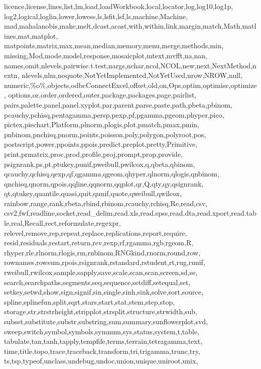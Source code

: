 {{      licence,license,lines,list,lm,load,loadWorkbook,local,locator,log,log10,log1p,%
      log2,logical,loglin,lower,lowess,ls,lsfit,lsf,ls,machine,Machine,%
      mad,mahalanobis,make,melt,dcast,acast,with,within,link,margin,match,Math,matlines,mat,matplot,%
      matpoints,matrix,max,mean,median,memory,menu,merge,methods,min,%
      missing,Mod,mode,model,response,mosaicplot,mtext,mvfft,na,nan,%
      names,omit,nlevels,pairwise.t.test,nargs,nchar,ncol,NCOL,new,next,NextMethod,nextn,%
      nlevels,nlm,noquote,NotYetImplemented,NotYetUsed,nrow,NROW,null,%
      numeric,\%o\%,objects,odbcConnectExcel,offset,old,on,Ops,optim,optimise,optimize,%
      options,or,order,ordered,outer,package,packages,page,pairlist,%
      pairs,palette,panel,panel.xyplot,par,parent,parse,paste,path,pbeta,pbinom,%
      pcauchy,pchisq,pentagamma,persp,pexp,pf,pgamma,pgeom,phyper,pico,%
      pictex,piechart,Platform,plnorm,plogis,plot,pmatch,pmax,pmin,%
      pnbinom,pnchisq,pnorm,points,poisson,poly,polygon,polyroot,pos,%
      postscript,power,ppoints,ppois,predict,preplot,pretty,Primitive,%
      print,prmatrix,proc,prod,profile,proj,prompt,prop,provide,%
      psignrank,ps,pt,ptukey,punif,pweibull,pwilcox,q,qbeta,qbinom,%
      qcauchy,qchisq,qexp,qf,qgamma,qgeom,qhyper,qlnorm,qlogis,qnbinom,%
      qnchisq,qnorm,qpois,qqline,qqnorm,qqplot,qr,Q,qty,qy,qsignrank,%
      qt,qtukey,quantile,quasi,quit,qunif,quote,qweibull,qwilcox,%
      rainbow,range,rank,rbeta,rbind,rbinom,rcauchy,rchisq,Re,read,csv,%
      csv2,fwf,readline,socket,read_delim,read.xls,read.spss,read.dta,read.xport,read.table,real,Recall,rect,reformulate,regexpr,%
      relevel,remove,rep,repeat,replace,replications,report,require,%
      resid,residuals,restart,return,rev,rexp,rf,rgamma,rgb,rgeom,R,%
      rhyper,rle,rlnorm,rlogis,rm,rnbinom,RNGkind,rnorm,round,row,%
      rownames,rowsum,rpois,rsignrank,rstandard,rstudent,rt,rug,runif,%
      rweibull,rwilcox,sample,sapply,save,scale,scan,scan,screen,sd,se,%
      search,searchpaths,segments,seq,sequence,setdiff,setequal,set,%
      setkey,setwd,show,sign,signif,sin,single,sinh,sink,solve,sort,source,%
      spline,splinefun,split,sqrt,stars,start,stat,stem,step,stop,%
      storage,str,strstrheight,stripplot,strsplit,structure,strwidth,sub,%
      subset,substitute,substr,substring,sum,summary,sunflowerplot,svd,%
      sweep,switch,symbol,symbols,symnum,sys,status,system,t,table,%
      tabulate,tan,tanh,tapply,tempfile,terms,terrain,tetragamma,text,%
      time,title,topo,trace,traceback,transform,tri,trigamma,trunc,try,%
      ts,tsp,typeof,unclass,undebug,undoc,union,unique,uniroot,unix,%
}}
